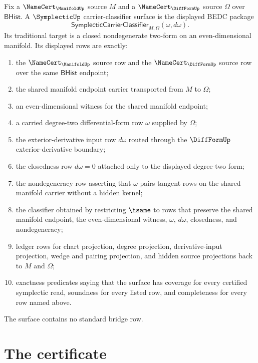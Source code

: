 \begin{definition}
\label{def:symplecticup-carrier-classifier-surface}
Fix a $\NameCert_{\ManifoldUp}$ source $M$ and a $\NameCert_{\DiffFormUp}$ source $\Omega$ over $\mathsf{BHist}$. A $\SymplecticUp$ carrier-classifier surface is the displayed BEDC package
$$
\mathsf{SymplecticCarrierClassifier}_{M,\Omega}(\omega,d\omega).
$$
Its traditional target is a closed nondegenerate two-form on an even-dimensional manifold. Its displayed rows are exactly:
\begin{enumerate}
  \item the $\NameCert_{\ManifoldUp}$ source row and the $\NameCert_{\DiffFormUp}$ source row over the same $\mathsf{BHist}$ endpoint;
  \item the shared manifold endpoint carrier transported from $M$ to $\Omega$;
  \item an even-dimensional witness for the shared manifold endpoint;
  \item a carried degree-two differential-form row $\omega$ supplied by $\Omega$;
  \item the exterior-derivative input row $d\omega$ routed through the $\DiffFormUp$ exterior-derivative boundary;
  \item the closedness row $d\omega=0$ attached only to the displayed degree-two form;
  \item the nondegeneracy row asserting that $\omega$ pairs tangent rows on the shared manifold carrier without a hidden kernel;
  \item the classifier obtained by restricting $\hsame$ to rows that preserve the shared manifold endpoint, the even-dimensional witness, $\omega$, $d\omega$, closedness, and nondegeneracy;
  \item ledger rows for chart projection, degree projection, derivative-input projection, wedge and pairing projection, and hidden source projections back to $M$ and $\Omega$;
  \item exactness predicates saying that the surface has coverage for every certified symplectic read, soundness for every listed row, and completeness for every row named above.
\end{enumerate}
The surface contains no standard bridge row.
\end{definition}

\section{The certificate}
\label{sec:symplectic-certificate}


